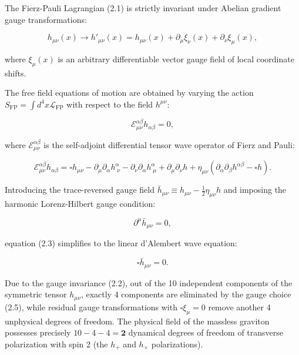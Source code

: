 \documentclass[11pt,a4paper]{article}
\theoremstyle{definition}
\begin{document}
The Fierz-Pauli Lagrangian (2.1) is strictly invariant under Abelian gradient gauge transformations:

\begin{equation}\label{eq:2.2}\tag{2.2}
h_{\mu\nu}(x) \to h'_{\mu\nu}(x) = h_{\mu\nu}(x) + \partial_\mu \xi_\nu(x) + \partial_\nu \xi_\mu(x),
\end{equation}

where $\xi_\mu(x)$ is an arbitrary differentiable vector gauge field of local coordinate shifts.

The free field equations of motion are obtained by varying the action $S_{\text{FP}} = \int d^4x \mathcal{L}_{\text{FP}}$ with respect to the field $h^{\mu\nu}$:

\begin{equation}\label{eq:2.3}\tag{2.3}
\mathcal{E}_{\mu\nu}^{\alpha\beta} h_{\alpha\beta} = 0,
\end{equation}

where $\mathcal{E}_{\mu\nu}^{\alpha\beta}$ is the self-adjoint differential tensor wave operator of Fierz and Pauli:

\begin{equation}\label{eq:2.4}\tag{2.4}
\mathcal{E}_{\mu\nu}^{\alpha\beta} h_{\alpha\beta} = \square h_{\mu\nu} - \partial_\mu \partial_\alpha h^\alpha_{\;\nu} - \partial_\nu \partial_\alpha h^\alpha_{\;\mu} + \partial_\mu \partial_\nu h + \eta_{\mu\nu} \left( \partial_\alpha \partial_\beta h^{\alpha\beta} - \square h \right).
\end{equation}

Introducing the trace-reversed gauge field $\bar{h}_{\mu\nu} \equiv h_{\mu\nu} - \frac{1}{2}\eta_{\mu\nu} h$ and imposing the harmonic Lorenz-Hilbert gauge condition:

\begin{equation}\label{eq:2.5}\tag{2.5}
\partial^\mu \bar{h}_{\mu\nu} = 0,
\end{equation}

equation (2.3) simplifies to the linear d'Alembert wave equation:

\begin{equation}\label{eq:2.6}\tag{2.6}
\square \bar{h}_{\mu\nu} = 0.
\end{equation}

Due to the gauge invariance (2.2), out of the 10 independent components of the symmetric tensor $h_{\mu\nu}$, exactly 4 components are eliminated by the gauge choice (2.5), while residual gauge transformations with $\square \xi_\mu = 0$ remove another 4 unphysical degrees of freedom. The physical field of the massless graviton possesses precisely $10 - 4 - 4 = \mathbf{2}$ dynamical degrees of freedom of transverse polarization with spin 2 (the $h_+$ and $h_\times$ polarizations).
\end{document}
